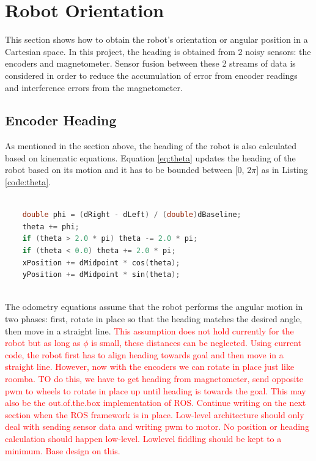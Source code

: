 \section{Robot Orientation}

This section shows how to obtain the robot's orientation or angular position in a Cartesian space. In this project, the heading is obtained from 2 noisy sensors: the encoders and magnetometer. Sensor fusion between these 2 streams of data is considered in order to reduce the accumulation of error from encoder readings and interference errors from the magnetometer.\\

\subsection{Encoder Heading}

As mentioned in the section above, the heading of the robot is also calculated based on kinematic equations. Equation \ref{eq:theta} updates the heading of the robot based on its motion and it has to be bounded between [0, 2$\pi$] as in Listing \ref{code:theta}.

\begin{lstlisting}[language=C++, caption={Robot heading update equations}, label={code:theta}]
	
	double phi = (dRight - dLeft) / (double)dBaseline;
	theta += phi;
	if (theta > 2.0 * pi) theta -= 2.0 * pi;
	if (theta < 0.0) theta += 2.0 * pi;
	xPosition += dMidpoint * cos(theta);
	yPosition += dMidpoint * sin(theta);
	
\end{lstlisting}

The odometry equations assume that the robot performs the angular motion in two phases: first, rotate in place so that the heading matches the desired angle, then move in a straight line. \textcolor{red}{This assumption does not hold currently for the robot but as long as $\phi$ is small, these distances can be neglected. Using current code, the robot first has to align heading towards goal and then move in a straight line. However, now with the encoders we can rotate in place just like roomba. TO do this, we have to get heading from magnetometer, send opposite pwm to wheels to rotate in place up until heading is towards the goal. This may also be the out.of.the.box implementation of ROS. Continue writing on the next section when the ROS framework is in place. Low-level architecture should only deal with sending sensor data and writing pwm to motor. No position or heading calculation should happen low-level. Lowlevel fiddling should be kept to a minimum. Base design on this.} 

